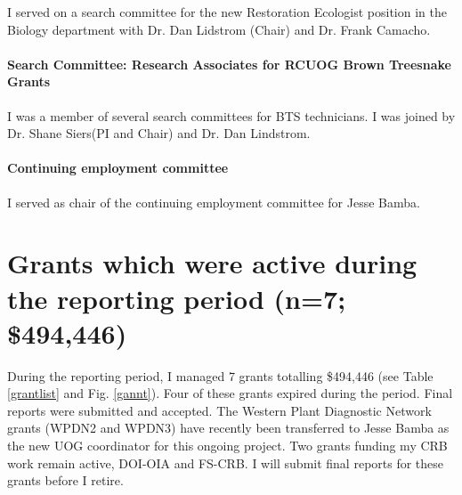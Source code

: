 I served on a search committee for the new Restoration Ecologist position in the Biology department with Dr. Dan Lidstrom (Chair) and Dr. Frank Camacho.

\paragraph{Search Committee: Research Associates for RCUOG Brown Treesnake Grants}

I was a member of several search committees for BTS technicians. I was joined by Dr. Shane Siers(PI and Chair) and Dr. Dan Lindstrom.

\paragraph{Continuing employment committee}

I served as chair of the continuing employment committee for Jesse Bamba.

\newpage
\section{Grants which were active during the reporting period (n=7; \$494,446)}

During the reporting period, I managed 7 grants totalling \$494,446 (see Table \ref{grantlist} and Fig. \ref{gannt}). Four of these grants expired during the period. Final reports were submitted and accepted. The Western Plant Diagnostic Network grants (WPDN2 and WPDN3) have recently been transferred to Jesse Bamba as the new UOG coordinator for this ongoing project. Two grants funding my CRB work remain active, DOI-OIA and FS-CRB. I will submit final reports for these grants before I retire.

